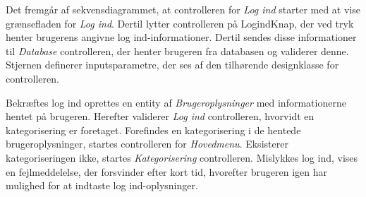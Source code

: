 \noindent
Det fremgår af sekvensdiagrammet, at controlleren for \textit{Log ind} starter med at vise grænsefladen for \textit{Log ind}. Dertil lytter controlleren på LogindKnap, der ved tryk henter brugerens angivne log ind-informationer. Dertil sendes disse informationer til \textit{Database} controlleren, der henter brugeren fra databasen og validerer denne. Stjernen definerer inputsparametre, der ses af den tilhørende designklasse for controlleren. 


Bekræftes log ind oprettes en entity af \textit{Brugeroplysninger} med informationerne hentet på brugeren. Herefter validerer \textit{Log ind} controlleren, hvorvidt en kategorisering er foretaget. Forefindes en kategorisering i de hentede brugeroplysninger, startes controlleren for \textit{Hovedmenu}. Eksisterer kategoriseringen ikke, startes \textit{Kategorisering} controlleren. Mislykkes log ind, vises en fejlmeddelelse, der forsvinder efter kort tid, hvorefter brugeren igen har mulighed for at indtaste log ind-oplysninger. 
